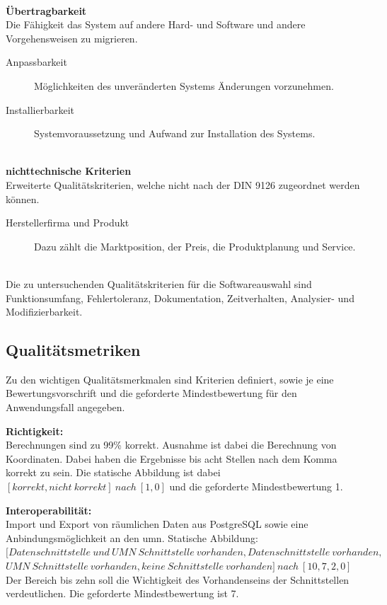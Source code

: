 \ \\
%
\textbf{Übertragbarkeit}\\
Die Fähigkeit das System auf andere Hard- und Software und andere Vorgehensweisen zu migrieren.
\begin{description}
\item[Anpassbarkeit] Möglichkeiten des unveränderten Systems Änderungen vorzunehmen.
\item[Installierbarkeit] Systemvoraussetzung und Aufwand zur Installation des Systems.
\end{description}
\ \\
%
\textbf{nichttechnische Kriterien}\\
Erweiterte Qualitätskriterien, welche nicht nach der DIN 9126 zugeordnet werden können.
\begin{description}
\item[Herstellerfirma und Produkt] Dazu zählt die Marktposition, der Preis, die Produktplanung und Service.
\end{description}
\ \\
%
Die zu untersuchenden Qualitätskriterien für die Softwareauswahl sind Funktionsumfang, Fehlertoleranz, Dokumentation, Zeitverhalten, Analysier- und Modifizierbarkeit.


\subsection{Qualitätsmetriken}
\label{qualitätsmetriken}
Zu den wichtigen Qualitätsmerkmalen sind Kriterien definiert, sowie je eine Bewertungsvorschrift und die geforderte Mindestbewertung für den Anwendungsfall angegeben.

\textbf{Richtigkeit:}\\
Berechnungen sind zu 99\% korrekt. Ausnahme ist dabei die Berechnung von Koordinaten. Dabei haben die Ergebnisse bis acht Stellen nach dem Komma korrekt zu sein.
Die statische Abbildung ist dabei $[korrekt, nicht\ korrekt]\ nach\ [1, 0]$ und die geforderte Mindestbewertung 1.

\textbf{Interoperabilität:}\\
Import und Export von räumlichen Daten aus PostgreSQL sowie eine Anbindungsmöglichkeit an den \Gls{umn}.
Statische Abbildung:\\
$[Datenschnittstelle\ und\ UMN\ Schnittstelle\ vorhanden,Datenschnittstelle\ vorhanden,$\\$UMN\ Schnittstelle\ vorhanden,keine\ Schnittstelle\ vorhanden]\ nach\ [10,7,2,0]$\\
Der Bereich bis zehn soll die Wichtigkeit des Vorhandenseins der Schnittstellen verdeutlichen.
Die geforderte Mindestbewertung ist 7.

